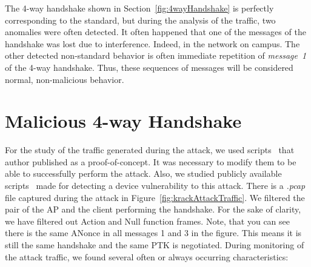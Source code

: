 The 4-way handshake shown in Section~\ref{fig:4wayHandshake} is perfectly corresponding to the standard, but during the analysis of the traffic, two anomalies were often detected. It often happened that one of the messages of the handshake was lost due to interference. Indeed, in the network on campus. The other detected non-standard behavior is often immediate repetition of \textit{message~1} of the 4-way handshake. Thus, these sequences of messages will be considered normal, non-malicious behavior.

\section{Malicious 4-way Handshake}
\label{sec:maliciousTraffic}

For the study of the traffic generated during the attack, we used scripts~\cite{vanhoefm_2018} that author published as a proof-of-concept. It was necessary to modify them to be able to successfully perform the attack. Also, we studied publicly available scripts~\cite{vanhoefm_2018} made for detecting a device vulnerability to this attack. There is a \textit{.pcap} file captured during the attack in Figure~\ref{fig:krackAttackTraffic}. We filtered the pair of the AP and the client performing the handshake. For the sake of clarity, we have filtered out Action and Null function frames. Note, that you can see there is the same ANonce in all messages 1 and 3 in the figure. This means it is still the same handshake and the same PTK is negotiated. During monitoring of the attack traffic, we found several often or always occurring characteristics:

